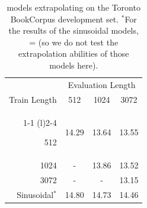\begin{table}[!htbp]
\caption{\al   models extrapolating on the Toronto BookCorpus development set. $^*$For the results of the sinusoidal models, \lt = \li (so we do not test the extrapolation abilities of those models here).}
\label{tab:books_lsb}
\begin{center}
\begin{tabular}{@{}rccc@{}}
\toprule
                               &  \multicolumn{3}{c}{Evaluation Length} \\  
               Train Length               & 512 & 1024  & 3072 \\\cmidrule(r){1-1} \cmidrule(l){2-4}

512 & 14.29 &13.64 &13.55  \\
 1024 & -&13.86 & 13.52 \\
3072 & -& -& 13.15\\ \midrule \midrule
Sinusoidal$^*$ &14.80 &14.73 & 14.46 \\
\bottomrule
\end{tabular}
\end{center}
\end{table}

